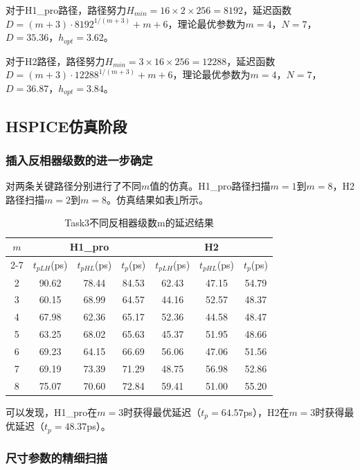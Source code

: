 \documentclass[UTF8,12pt,a4paper]{ctexart}
\begin{document}
对于H1\_pro路径，路径努力$H_{min} = 16 \times 2 \times 256 = 8192$，延迟函数$D = (m+3) \cdot 8192^{1/(m+3)} + m + 6$，理论最优参数为$m = 4$，$N = 7$，$D = 35.36$，$h_{opt} = 3.62$。

对于H2路径，路径努力$H_{min} = 3 \times 16 \times 256 = 12288$，延迟函数$D = (m+3) \cdot 12288^{1/(m+3)} + m + 6$，理论最优参数为$m = 4$，$N = 7$，$D = 36.87$，$h_{opt} = 3.84$。

\subsection{HSPICE仿真阶段}

\subsubsection{插入反相器级数的进一步确定}

对两条关键路径分别进行了不同$m$值的仿真。H1\_pro路径扫描$m = 1$到$m = 8$，H2路径扫描$m = 2$到$m = 8$。仿真结果如表\ref{tab:task3_m}所示。

\begin{table}[htbp]
\centering
\caption{Task3不同反相器级数m的延迟结果}
\label{tab:task3_m}
\begin{tabular}{|c|c|c|c|c|c|c|}
\hline
$m$ & \multicolumn{3}{c|}{H1\_pro} & \multicolumn{3}{c|}{H2} \\
\cline{2-7}
 & $t_{pLH}$(ps) & $t_{pHL}$(ps) & $t_p$(ps) & $t_{pLH}$(ps) & $t_{pHL}$(ps) & $t_p$(ps) \\
\hline
2 & 90.62 & 78.44 & 84.53 & 62.43 & 47.15 & 54.79 \\
3 & 60.15 & 68.99 & 64.57 & 44.16 & 52.57 & 48.37 \\
4 & 67.98 & 62.36 & 65.17 & 52.36 & 44.58 & 48.47 \\
5 & 63.25 & 68.02 & 65.63 & 45.37 & 51.95 & 48.66 \\
6 & 69.23 & 64.15 & 66.69 & 56.06 & 47.06 & 51.56 \\
7 & 69.19 & 73.39 & 71.29 & 48.75 & 56.98 & 52.86 \\
8 & 75.07 & 70.60 & 72.84 & 59.41 & 51.00 & 55.20 \\
\hline
\end{tabular}
\end{table}

可以发现，H1\_pro在$m = 3$时获得最优延迟（$t_p = 64.57$ps），H2在$m = 3$时获得最优延迟（$t_p = 48.37$ps）。

\subsubsection{尺寸参数的精细扫描}
\end{document}
